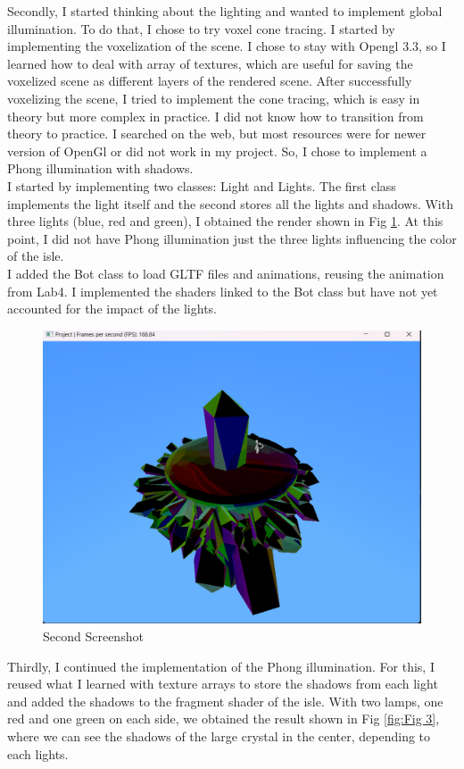\documentclass[acmtog,screen,review,nonacm]{acmart}
\begin{document}
Secondly, I started thinking about the lighting and wanted to implement global illumination. To do that, I chose to try voxel cone tracing. I started by implementing the voxelization of the scene. I chose to stay with Opengl 3.3, so I learned how to deal with array of textures, which are useful for saving the voxelized scene as different layers of the rendered scene. After successfully voxelizing the scene, I tried to implement the cone tracing, which is easy in theory but more complex in practice. I did not know how to transition from theory to practice. I searched on the web,  but most resources were for newer version of OpenGl or did not work in my project. So, I chose to implement a Phong illumination with shadows.\\
I started by implementing two classes: Light and Lights. The first class implements the light itself and the second stores all the lights and shadows. With three lights (blue, red and green), I obtained the render shown in Fig \ref{fig:Fig 2}. At this point, I did not have Phong illumination just the three lights influencing the color of the isle.\\
I added the Bot class to load GLTF files and animations, reusing the animation from Lab4. I implemented the shaders linked to the Bot class but have not yet accounted for the impact of the lights.

\begin{figure}[H]
    \centering
    \includegraphics[width=0.5\linewidth]{save/Save2_08_12_2024.png}
    \caption{Second Screenshot}
    \label{fig:Fig 2}
\end{figure}

Thirdly, I continued the implementation of the Phong illumination. For this, I reused what I learned with texture arrays to store the shadows from each light and added the shadows to the fragment shader of the isle. With two lamps, one red and one green on each side, we obtained the result shown in Fig \ref{fig:Fig 3}, where we can see the shadows of the large crystal in the center, depending to each lights.
\end{document}
